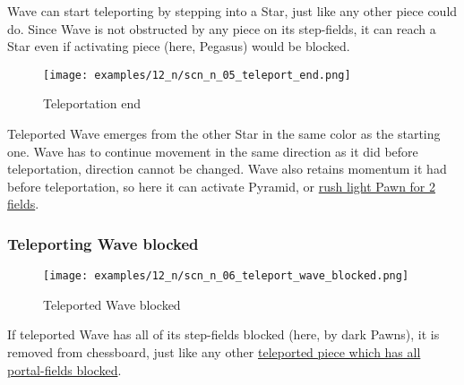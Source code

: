 Wave can start teleporting by stepping into a Star, just like any other piece could
do. Since Wave is not obstructed by any piece on its step-fields, it can reach a Star
even if activating piece (here, Pegasus) would be blocked.

\clearpage %

\vspace*{-2.0\baselineskip}
\noindent
\begin{figure}[!h]
\texttt{[image: examples/12\_n/scn\_n\_05\_teleport\_end.png]}
\caption{Teleportation end}
\label{fig:scn_n_05_teleport_end}
\end{figure}

Teleported Wave emerges from the other Star in the same color as the starting one.
Wave has to continue movement in the same direction as it did before teleportation,
direction cannot be changed. Wave also retains momentum it had before teleportation,
so here it can activate Pyramid, or
\hyperref[fig:scn_mv_33_activating_rush_pawn_init]{rush light Pawn for 2 fields}.

\clearpage %

\subsubsection*{Teleporting Wave blocked}
\label{sec:Nineteen/Star/Teleporting pieces/Teleporting Wave blocked}

\vspace*{-1.0\baselineskip}
\noindent
\begin{figure}[!h]
\texttt{[image: examples/12\_n/scn\_n\_06\_teleport\_wave\_blocked.png]}
\caption{Teleported Wave blocked}
\label{fig:scn_n_06_teleport_wave_blocked}
\end{figure}

If teleported Wave has all of its step-fields blocked (here, by dark Pawns), it is
removed from chessboard, just like any other
\hyperref[fig:scn_n_03_teleport_move_2]{teleported piece which has all portal-fields blocked}.

\clearpage %

